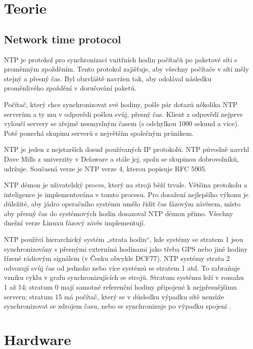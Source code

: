 \section{Teorie}
\subsection{Network time protocol}

NTP je protokol pro synchronizaci vnitřních hodin počítačů po paketové síti s proměnným zpožděním. Tento protokol zajišťuje, aby všechny počítače v síti měly stejný a přesný čas. Byl obzvláště navržen tak, aby odolával následku proměnlivého zpoždění v doručování paketů.

Počítač, který chce synchronizovat své hodiny, pošle pár dotazů několika NTP serverům a ty mu v odpovědi pošlou svůj, přesný čas. Klient z odpovědí nejprve vyloučí servery se zřejmě nesmyslným časem (s odchylkou 1000 sekund a více). Poté ponechá skupinu serverů s největším společným průnikem.

NTP je jeden z nejstarších dosud používaných IP protokolů. NTP původně navrhl Dave Mills z univerzity v Delaware a stále jej, spolu se skupinou dobrovolníků, udržuje. Současná verze je NTP verze 4, kterou popisuje RFC 5905.

NTP démon je uživatelský proces, který na stroji běží trvale. Většina protokolu a inteligence je implementována v tomto procesu. Pro dosažení nejlepšího výkonu je důležité, aby jádro operačního systému umělo řídit čas fázovým závěsem, místo aby přesný čas do systémových hodin dosazoval NTP démon přímo. Všechny dnešní verze Linuxu fázový závěs implementují.

NTP používá hierarchický systém „strata hodin“, kde systémy se stratem 1 jsou
synchronizovány s přesnými externími hodinami jako třeba GPS nebo jiné hodiny řízené
rádiovým signálem (v Česku obvykle DCF77). NTP systémy strata 2 odvozují svůj čas od
jednoho nebo více systémů se stratem 1 atd. To zabraňuje vzniku cyklu v grafu
synchronizujících se strojů. Stratum systému leží v rozsahu 1 až 14; stratum 0 mají
samotné referenční hodiny připojené k nejpřesnějšímu serveru; stratum 15 má počítač, který
se v důsledku výpadku sítě nemůže synchronizovat se zdrojem času, nebo se synchronizuje po
výpadku spojení \cite{ntp}.

\section{Hardware}

